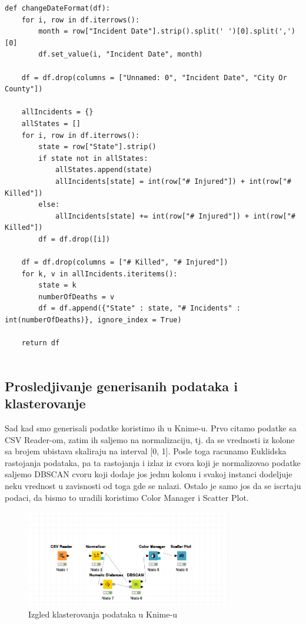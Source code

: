 \documentclass[11pt]{article} %
\begin{document}
	\begin{lstlisting}
def changeDateFormat(df):
	for i, row in df.iterrows():
		month = row["Incident Date"].strip().split(' ')[0].split(',')[0]
		df.set_value(i, "Incident Date", month)
	
	df = df.drop(columns = ["Unnamed: 0", "Incident Date", "City Or County"])
	
	allIncidents = {}
	allStates = []
	for i, row in df.iterrows():
		state = row["State"].strip()
		if state not in allStates:
			allStates.append(state)
			allIncidents[state] = int(row["# Injured"]) + int(row["# Killed"])
		else:
			allIncidents[state] += int(row["# Injured"]) + int(row["# Killed"])
		df = df.drop([i])
	
	df = df.drop(columns = ["# Killed", "# Injured"])
	for k, v in allIncidents.iteritems():
		state = k
		numberOfDeaths = v
		df = df.append({"State" : state, "# Incidents" : int(numberOfDeaths)}, ignore_index = True)
	
	return df
	
    \end{lstlisting}
	
	\subsection{Prosledjivanje generisanih podataka i klasterovanje}
	Sad kad smo generisali podatke koristimo ih u Knime-u.
	Prvo citamo podatke sa CSV Reader-om, zatim ih saljemo na normalizaciju, tj. da se vrednosti iz kolone sa brojem ubistava skaliraju na interval [0, 1].
	Posle toga racunamo Euklidska rastojanja podataka, pa ta rastojanja i izlaz iz cvora koji je normalizovao podatke saljemo DBSCAN cvoru koji 
	dodaje jos jednu kolonu i svakoj instanci dodeljuje neku vrednost u zavisnosti od toga gde se nalazi.
	Ostalo je samo jos da se iscrtaju podaci, da bismo to uradili koristimo Color Manager i Scatter Plot.
	\newline
	
	\begin{figure}[h!]
	\centering
		\includegraphics[width=0.8\textwidth]{klasterovanjeKnime}
		\caption{Izgled klasterovanja podataka u Knime-u}
	\end{figure}
	
\end{document}
